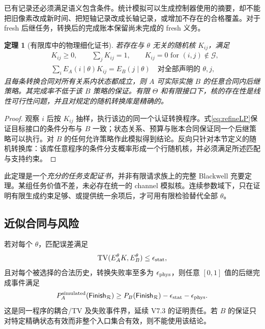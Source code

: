 \documentclass[UTF8,11pt,a4paper,fontset=fandol]{ctexart}
\numberwithin{equation}{section}
\newtheorem{theorem}{定理}[section]
\theoremstyle{definition}
\newcommand{\TV}{\operatorname{TV}}
\begin{document}
已有记录还必须满足语义包含条件。统计模拟可以生成控制器使用的摘要，却不能把旧像素改成新时间、把短轴记录改成长轴记录，或增加不存在的合格覆盖。对于 fresh 后继任务，转换后的完成账本保留尚未完成的 fresh 义务。

\begin{theorem}[有限库中的物理细化证书]
\label{thm:refine}
若存在与 $\theta$ 无关的随机核 $K_{ij}$，满足
\begin{align}
&K_{ij}\ge0,\qquad \sum_jK_{ij}=1,\qquad K_{ij}=0\text{ for }(i,j)\notin\mathcal G,\\
&\sum_i E_A(i\mid\theta)K_{ij}=E_B(j\mid\theta)
\quad\text{对全部声明的 }\theta,j,
\label{eq:refineLP}
\end{align}
且每条转换合同对所有关系内状态都成立，则 $A$ 可实际实施 $B$ 的任意合同内后继策略。其完成率不低于该 $B$ 策略的保证。有限 $\Theta$ 和有限接口下，核的存在性是线性可行性问题，并且对规定的随机转换库是精确的。
\end{theorem}
\begin{proof}
观察 $i$ 后按 $K_{ij}$ 抽样，执行该边的同一个认证转换程序。式\eqref{eq:refineLP}保证目标接口的条件分布与 $B$ 一致；状态关系、预算与账本合同保证同一个后继策略可以执行。对 $B$ 的任何允许策略作此模拟得到结论。反向只针对本节定义的随机转换库：该库任意程序的条件分支概率形成一个行随机核，并必须满足所述匹配与支持约束。\end{proof}

此定理是一个\emph{充分的任务支配证书}，并非有限请求族上的完整 Blackwell 充要定理。某组任务价值不差，未必存在统一的 channel 模拟核。连续参数域下，只在证明有限生成约束足够、或提供统一余项后，才可用有限检验替代全部 $\theta$。

\subsection{近似合同与风险}
若对每个 $\theta$，匹配误差满足
\begin{equation}
\TV(E_A^\theta K,E_B^\theta)\le\epsilon_{\rm stat},
\end{equation}
且对每个被选择的合法历史，转换失败率至多为 $\epsilon_{\rm phys}$，则任意 $[0,1]$ 值的后继完成事件满足
\begin{equation}
P_A^{\rm simulated}(\mathsf{Finish}_{\mathcal R})
\ge P_B(\mathsf{Finish}_{\mathcal R})
-\epsilon_{\rm stat}-\epsilon_{\rm phys}.
\label{eq:refineerror}
\end{equation}
这是同一程序的耦合/TV 及失败事件界，延续 V7.3 的证明责任\cite{v73}。若 $B$ 的保证只对特定精确状态有效而非整个入口集合有效，则不能使用该结论。
\end{document}
